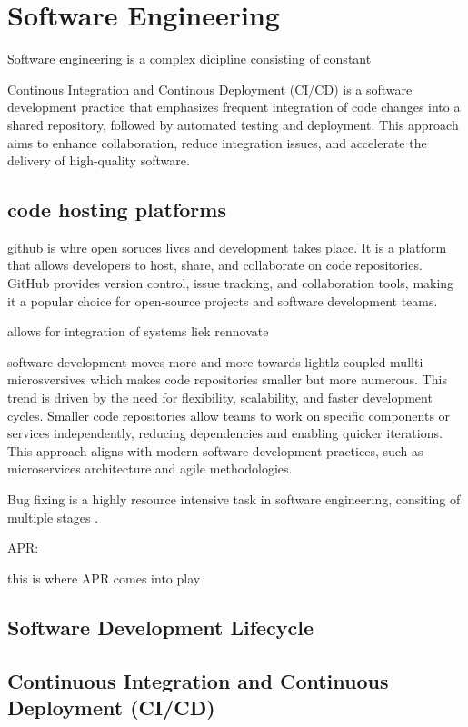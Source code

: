 \section{Software Engineering}
Software engineering is a complex dicipline consisting of constant


Continous Integration and Continous Deployment (CI/CD) is a software development practice that emphasizes frequent integration of code changes into a shared repository, followed by automated testing and deployment. This approach aims to enhance collaboration, reduce integration issues, and accelerate the delivery of high-quality software.


\subsection{code hosting platforms}
github is whre open soruces lives and development takes place. It is a platform that allows developers to host, share, and collaborate on code repositories. GitHub provides version control, issue tracking, and collaboration tools, making it a popular choice for open-source projects and software development teams.

allows for integration of systems liek rennovate


software development moves more and more towards lightlz coupled mullti microsversives which makes code repositories smaller but more numerous. This trend is driven by the need for flexibility, scalability, and faster development cycles. Smaller code repositories allow teams to work on specific components or services independently, reducing dependencies and enabling quicker iterations. This approach aligns with modern software development practices, such as microservices architecture and agile methodologies. 


Bug fixing is a highly resource intensive task in software engineering, consiting of multiple stages .

APR:

this is where APR comes into play

\subsection{Software Development Lifecycle}

\subsection{Continuous Integration and Continuous Deployment (CI/CD)}


